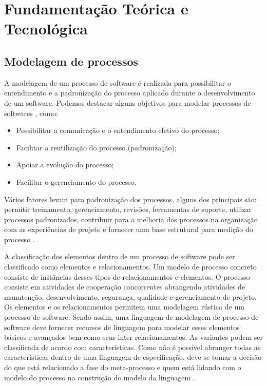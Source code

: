 \section{Fundamentação Teórica e Tecnológica}\label{fundamentacaoTeorica}

\subsection{Modelagem de processos}
A modelagem de um processo de software é realizada para possibilitar o entendimento e a padronização do processo aplicado durante o desenvolvimento de um software. Podemos destacar alguns objetivos para modelar processos de softwares \cite{genvigir2003modelagem}, como:

\begin{itemize}
	\item Possibilitar a comunicação e o entendimento efetivo do processo;
	\item Facilitar a reutilização do processo (padronização);
	\item Apoiar a evolução do processo;
	\item Facilitar o gerenciamento do processo.
\end{itemize}

Vários fatores levam para padronização dos processos, alguns dos principais são: permitir treinamento, gerenciamento, revisões, ferramentas de suporte, utilizar processos padronizados, contribuir para a melhoria dos processos na organização com as experiências de projeto e fornecer uma base estrutural para medição do processo \cite{genvigir2003modelagem}.


A classificação dos elementos dentro de um processo de software pode ser classificado como elementos e relacionamentos. Um modelo de processo concreto consiste de instâncias desses tipos de relacionamentos e elementos. O processo consiste em atividades de cooperação concorrentes abrangendo atividades de manutenção, desenvolvimento, segurança, qualidade e gerenciamento de projeto. Os elementos e os relacionamentos permitem uma modelagem rústica de um processo de software. Sendo assim, uma linguagem de modelagem de processo de software deve fornecer recursos de linguagem para modelar esses elementos básicos e avançados bem como seus inter-relacionamentos. As variantes podem ser classificada de acordo com características. Como não é possível abranger todas as características dentro de uma linguagem de especificação, deve se tomar a decisão do que está relacionado a fase do meta-processo e quem está lidando com o modelo do processo na construção do modelo da linguagem \cite{genvigir2003modelagem}.


